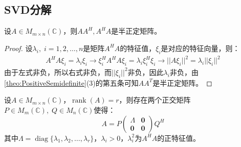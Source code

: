 \subsection{SVD分解}
\begin{theorem}\label{theo:AATPositiveSemidefinite}
	设$A\in M_{m\times n}(\mathbb{C})$，则$AA^H,A^HA$是半正定矩阵。
\end{theorem}
\begin{proof}
	设$\lambda_i,\;i=1,2,\dots,n$是矩阵$A^HA$的特征值，$\xi_i$是对应的特征向量，则：
	\begin{align*}
		A^HA\xi_i=\lambda_i\xi_i\rightarrow
		\xi_i^HA^HA\xi_i=\lambda_i\xi_i^H\xi_i\rightarrow
		||A\xi_i||^2=\lambda_i||\xi_i||^2
	\end{align*}
	由于左式非负，所以右式非负，而$||\xi_i||^2$非负，因此$\lambda_i$非负，由\cref{theo:PositiveSemidefinite}(3)的第五条可知$AA^T$是半正定矩阵。
\end{proof}
\begin{theorem}\label{theo:SVD}
	设$A\in M_{m\times n}(\mathbb{C})$，$\operatorname{rank}(A)=r$，则存在两个正交矩阵$P\in M_{m}(\mathbb{C}),\;Q\in M_{n}(\mathbb{C})$使得：
	\begin{equation*}
		A=P
		\begin{pmatrix}
			\varLambda & \mathbf{0} \\
			\mathbf{0} & \mathbf{0}
		\end{pmatrix}Q^H
	\end{equation*}
	其中$\varLambda=\operatorname{diag}\{\lambda_1,\lambda_2,\dots,\lambda_r\}$，$\lambda_i>0$，$\lambda_i^2$为$A^HA$的正特征值。
\end{theorem}
